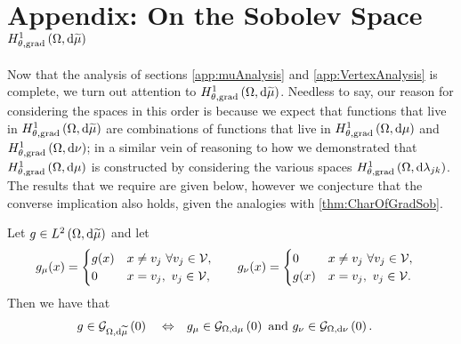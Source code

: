 \section{Appendix: On the Sobolev Space $H^1_{\theta, \mathrm{grad}}\left( \Omega, \mathrm{d}\widetilde{\mu} \right)$} \label{app:SumMeasureAnalysis}
Now that the analysis of sections \ref{app:muAnalysis} and \ref{app:VertexAnalysis} is complete, we turn out attention to $H^1_{\theta, \mathrm{grad}}\left( \Omega, \mathrm{d}\widetilde{\mu} \right)$.
Needless to say, our reason for considering the spaces in this order is because we expect that functions that live in $H^1_{\theta, \mathrm{grad}}\left( \Omega, \mathrm{d}\widetilde{\mu} \right)$ are combinations of functions that live in $H^1_{\theta, \mathrm{grad}}\left( \Omega, \mathrm{d}\mu \right)$ and $H^1_{\theta, \mathrm{grad}}\left( \Omega, \mathrm{d}\nu \right)$; in a similar vein of reasoning to how we demonstrated that $H^1_{\theta, \mathrm{grad}}\left( \Omega, \mathrm{d}\mu \right)$ is constructed by considering the various spaces $H^1_{\theta, \mathrm{grad}}\left( \Omega, \mathrm{d}\lambda_{jk} \right)$.
The results that we require are given below, however we conjecture that the converse implication also holds, given the analogies with \ref{thm:CharOfGradSob}.
\begin{prop} \label{prop:ThickVertexGradZeroIFF}
	Let $g\in L^{2}\left( \Omega,\mathrm{d}\widetilde{\mu} \right)$ and let 
	\begin{align*}
		g_{\mu}(x) = \begin{cases} g(x) & x\neq v_j \ \forall v_j\in\mathcal{V}, \\ 0 & x=v_j, \ v_j\in\mathcal{V}, \end{cases} 
		&\qquad
		g_{\nu}(x) = \begin{cases} 0 & x\neq v_j \ \forall v_j\in\mathcal{V}, \\ g(x) & x=v_j, \ v_j\in\mathcal{V}. \end{cases}
	\end{align*}		
	Then we have that
	\begin{align*}
		g\in\mathcal{G}_{ \Omega, \mathrm{d}\widetilde{\mu}}\left( 0 \right) \quad\Leftrightarrow\quad 
		& g_{\mu}\in\mathcal{G}_{ \Omega, \mathrm{d}\mu}\left( 0 \right) \text{ and } g_{\nu}\in\mathcal{G}_{ \Omega, \mathrm{d}\nu}\left( 0 \right).
	\end{align*}
\end{prop}
